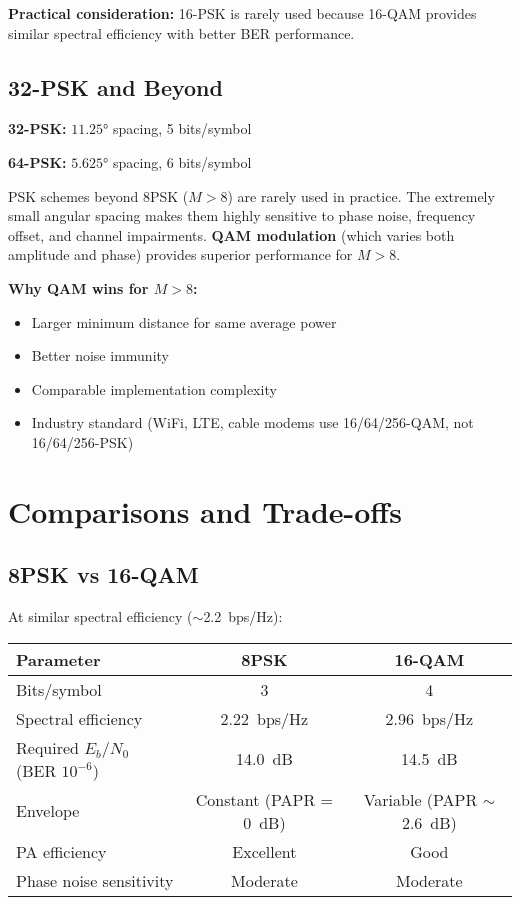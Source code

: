 \textbf{Practical consideration:} 16-PSK is rarely used because 16-QAM provides similar spectral efficiency with better BER performance.

\subsection{32-PSK and Beyond}

\textbf{32-PSK:} $11.25°$ spacing, 5 bits/symbol

\textbf{64-PSK:} $5.625°$ spacing, 6 bits/symbol

\begin{warningbox}
PSK schemes beyond 8PSK ($M > 8$) are rarely used in practice. The extremely small angular spacing makes them highly sensitive to phase noise, frequency offset, and channel impairments. \textbf{QAM modulation} (which varies both amplitude and phase) provides superior performance for $M > 8$.
\end{warningbox}

\textbf{Why QAM wins for $M > 8$:}
\begin{itemize}
\item Larger minimum distance for same average power
\item Better noise immunity
\item Comparable implementation complexity
\item Industry standard (WiFi, LTE, cable modems use 16/64/256-QAM, not 16/64/256-PSK)
\end{itemize}

\section{Comparisons and Trade-offs}

\subsection{8PSK vs 16-QAM}

At similar spectral efficiency ($\sim$2.2~bps/Hz):

\begin{center}
\begin{tabular}{@{}lcc@{}}
\toprule
Parameter & 8PSK & 16-QAM \\
\midrule
Bits/symbol & 3 & 4 \\
Spectral efficiency & 2.22~bps/Hz & 2.96~bps/Hz \\
Required $E_b/N_0$ (BER $10^{-6}$) & 14.0~dB & 14.5~dB \\
Envelope & Constant (PAPR = 0~dB) & Variable (PAPR $\sim$2.6~dB) \\
PA efficiency & Excellent & Good \\
Phase noise sensitivity & Moderate & Moderate \\
\bottomrule
\end{tabular}
\end{center}

